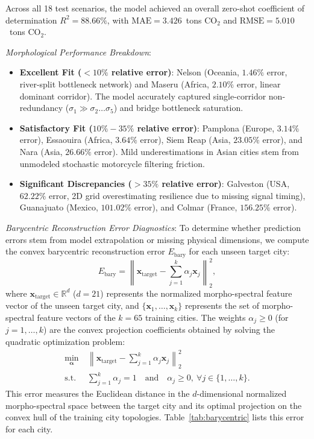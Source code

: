 \documentclass[lettersize,journal]{IEEEtran}
\begin{document}
Across all 18 test scenarios, the model achieved an overall zero-shot coefficient of determination $R^2 = 88.66\%$, with $\text{MAE} = 3.426$~tons $\text{CO}_2$ and $\text{RMSE} = 5.010$~tons $\text{CO}_2$. 

\textit{Morphological Performance Breakdown}:
\begin{itemize}
    \item \textbf{Excellent Fit ($<10\%$ relative error)}: Nelson (Oceania, $1.46\%$ error, river-split bottleneck network) and Maseru (Africa, $2.10\%$ error, linear dominant corridor). The model accurately captured single-corridor non-redundancy ($\sigma_1 \gg \sigma_2 \dots \sigma_5$) and bridge bottleneck saturation.
    \item \textbf{Satisfactory Fit ($10\% - 35\%$ relative error)}: Pamplona (Europe, $3.14\%$ error), Essaouira (Africa, $3.64\%$ error), Siem Reap (Asia, $23.05\%$ error), and Nara (Asia, $26.66\%$ error). Mild underestimations in Asian cities stem from unmodeled stochastic motorcycle filtering friction.
    \item \textbf{Significant Discrepancies ($>35\%$ relative error)}: Galveston (USA, $62.22\%$ error, 2D grid overestimating resilience due to missing signal timing), Guanajuato (Mexico, $101.02\%$ error), and Colmar (France, $156.25\%$ error). 
\end{itemize}

\textit{Barycentric Reconstruction Error Diagnostics}: To determine whether prediction errors stem from model extrapolation or missing physical dimensions, we compute the convex barycentric reconstruction error $E_{\text{bary}}$ for each unseen target city:
\begin{equation}
E_{\text{bary}} = \left\| \mathbf{x}_{\text{target}} - \sum_{j=1}^k \alpha_j \mathbf{x}_j \right\|_2^2,
\end{equation}
where $\mathbf{x}_{\text{target}} \in \mathbb{R}^{d}$ ($d=21$) represents the normalized morpho-spectral feature vector of the unseen target city, and $\{\mathbf{x}_1, \dots, \mathbf{x}_k\}$ represents the set of morpho-spectral feature vectors of the $k=65$ training cities. The weights $\alpha_j \ge 0$ (for $j = 1, \dots, k$) are the convex projection coefficients obtained by solving the quadratic optimization problem:
\begin{align}
\min_{\boldsymbol{\alpha}} \ & \left\| \mathbf{x}_{\text{target}} - \sum_{j=1}^k \alpha_j \mathbf{x}_j \right\|_2^2 \\
\text{s.t.} \ & \sum_{j=1}^k \alpha_j = 1 \quad \text{and} \quad \alpha_j \ge 0, \ \forall j \in \{1, \dots, k\}.
\end{align}
This error measures the Euclidean distance in the $d$-dimensional normalized morpho-spectral space between the target city and its optimal projection on the convex hull of the training city topologies. Table~\ref{tab:barycentric} lists this error for each city.
\end{document}
